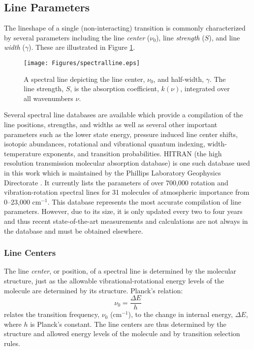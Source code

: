 \documentclass[11pt]{article}
\begin{document}
\subsection{Line Parameters}\label{sec:lines}

The lineshape of a single (non-interacting) transition is commonly 
characterized by several parameters including the line {\it center} 
($\nu_0$), 
line {\it strength} ($S$), and line {\it width} ($\gamma$).  These are
illustrated in Figure \ref{fig:spectralline}.
\begin{figure}[h]
  \begin{center}
  \texttt{[image: Figures/spectralline.eps]}
  \end{center}
  \caption[A spectral line depicting the line center and line width.]
	{A spectral line depicting the line center, $\nu_0$, and half-width,
	$\gamma$.  The line strength, $S$, is the absorption coefficient,
	$k(\nu)$, integrated over all wavenumbers $\nu$.}
  \label{fig:spectralline}
\end{figure}

Several spectral line databases are available which provide a compilation
of the line positions, strengths, and widths as well as several other
important parameters such as the lower state energy, pressure induced line
center shifts, isotopic abundances, rotational and vibrational quantum
indexing, width-temperature exponents, and transition probabilities.
HITRAN\cite{rot:87,rot:92} 
(the high resolution transmission molecular absorption database) 
is one such database used in this work which is maintained by the Phillips 
Laboratory Geophysics Directorate .  It currently lists the
parameters of over 700,000 rotation and vibration-rotation spectral lines
for 31 molecules of atmospheric importance from 0--23,000 cm$^{-1}$.
This database represents the most accurate compilation of line parameters.
However, due to its size, it is only updated every two to four years and 
thus recent
state-of-the-art measurements and calculations are not always in the
database and must be obtained elsewhere.

\subsubsection{Line Centers}

The line {\it center}, or position, of a spectral line is determined by the
molecular structure, just as the allowable vibrational-rotational energy
levels of the molecule are determined by its structure.  Planck's relation: 
\begin{equation}
\nu_{0}=\frac{\Delta E}{h}
\end{equation}
relates the transition frequency, $\nu_{0}$ (cm$^{-1}$), to the 
change in internal energy, $\Delta E$, where $h$ is Planck's constant.  
The line centers are thus determined by the structure and allowed energy
levels of the molecule and by transition selection rules. 
\end{document}
